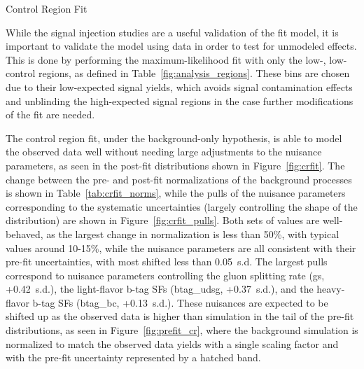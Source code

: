 \begin{subsection}{Control Region Fit}
\label{subsec:crfit}

While the signal injection studies are a useful validation of the fit model, it is important to validate the model using data in order to test for unmodeled effects.
This is done by performing the maximum-likelihood fit with only the low-\Njets, low-\MJ control regions, as defined in Table~\ref{fig:analysis_regions}.
These bins are chosen due to their low-expected signal yields, which avoids signal contamination effects and unblinding the high-expected signal regions in the case further modifications of the fit are needed.

The control region fit, under the background-only hypothesis, is able to model the observed data well without needing large adjustments to the nuisance parameters, as seen in the post-fit \Nb distributions shown in Figure~\ref{fig:crfit}.
The change between the pre- and post-fit normalizations of the background processes is shown in Table~\ref{tab:crfit_norms}, while the pulls of the nuisance parameters corresponding to the systematic uncertainties (largely controlling the shape of the \Nb distribution) are shown in Figure~\ref{fig:crfit_pulls}.
Both sets of values are well-behaved, as the largest change in normalization is less than 50\%, with typical values around 10-15\%, while the nuisance parameters are all consistent with their pre-fit uncertainties, with most shifted less than 0.05~s.d.
The largest pulls correspond to nuisance parameters controlling the gluon splitting rate (gs, +0.42~s.d.), the light-flavor b-tag SFs (btag\_udsg, +0.37~s.d.), and the heavy-flavor b-tag SFs (btag\_bc, +0.13~s.d.).
These nuisances are expected to be shifted up as the observed data is higher than simulation in the tail of the pre-fit \Nb distributions, as seen in Figure~\ref{fig:prefit_cr}, where the background simulation is normalized to match the observed data yields with a single scaling factor and with the pre-fit uncertainty represented by a hatched band.


\end{subsection}
